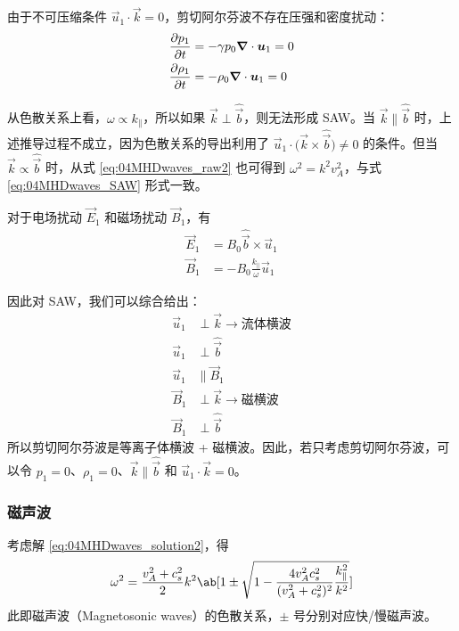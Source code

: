 由于不可压缩条件 $\vec{u}_1 \cdot \vec{k} = 0$，剪切阿尔芬波不存在压强和密度扰动：
\begin{subequations}\begin{align}
\pdv{p_1}{t} &= - \gamma p_0 \bm{\nabla} \cdot{\bm{u}_1} = 0 \\
\pdv{\rho_1}{t} &= - \rho_0 \bm{\nabla} \cdot{\bm{u}_1} = 0
\end{align}\end{subequations}

从色散关系上看，$\omega \propto k_\parallel$，所以如果 $\vec{k} \perp \hat{\vec{b}}$，则无法形成 SAW。当 $\vec{k} \parallel \hat{\vec{b}}$ 时，上述推导过程不成立，因为色散关系的导出利用了 $\vec{u}_1 \cdot \big(\vec{k} \times \hat{\vec{b}} \big) \neq 0$ 的条件。但当 $\vec{k} \propto \hat{\vec{b}}$ 时，从式 \ref{eq:04MHDwaves_raw2} 也可得到 $\omega^2 = k^2 v_A^2$，与式 \ref{eq:04MHDwaves_SAW} 形式一致。

对于电场扰动 $\vec{E}_1$ 和磁场扰动 $\vec{B}_1$，有
\begin{subequations}\begin{align}
\vec{E}_1 &= B_0 \hat{\vec{b}} \times \vec{u}_1 \\
\vec{B}_1 &= - B_0 \frac{k_\parallel}{\omega} \vec{u}_1
\end{align}\end{subequations}

因此对 SAW，我们可以综合给出：
\begin{subequations}\begin{align}
\vec{u}_1 &\perp \vec{k} \rightarrow \text{流体横波} \\
\vec{u}_1 &\perp \hat{\vec{b}} \\
\vec{u}_1 &\parallel \vec{B}_1 \\
\vec{B}_1 &\perp \vec{k} \rightarrow \text{磁横波} \\
\vec{B}_1 &\perp \hat{\vec{b}}
\end{align}\end{subequations}
所以剪切阿尔芬波是等离子体横波 + 磁横波。因此，若只考虑剪切阿尔芬波，可以令 $p_1=0$、$\rho_1=0$、$\vec{k}\parallel\hat{\vec{b}}$ 和 $\vec{u}_1 \cdot \vec{k}=0$。

\subsubsection{磁声波}

考虑解 \ref{eq:04MHDwaves_solution2}，得
\begin{equation}
\omega^2 = \frac{v_A^2 + c_s^2}{2} k^2 \ab[
    1 \pm \sqrt{1 - \frac{
        4 v_A^2 c_s^2
    }{
        (v_A^2 + c_s^2)^2
    }
    \frac{k_\parallel^2}{k^2} }
]
\end{equation}
此即磁声波（Magnetosonic waves）的色散关系，$\pm$ 号分别对应快/慢磁声波。

